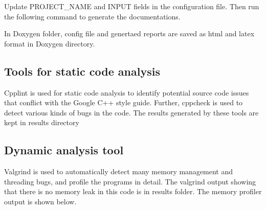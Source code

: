 \begin{DoxyCode}{0}
\end{DoxyCode}
 Update P\+R\+O\+J\+E\+C\+T\+\_\+\+N\+A\+ME and I\+N\+P\+UT fields in the configuration file. Then run the following command to generate the documentations. 
\begin{DoxyCode}{0}
\end{DoxyCode}
 In Doxygen folder, config file and genertaed reports are saved as html and latex format in Doxygen directory.

\subsection*{Tools for static code analysis}

Cpplint is used for static code analysis to identify potential source code issues that conflict with the Google C++ style guide. Further, cppcheck is used to detect various kinds of bugs in the code. The results generated by these tools are kept in results directory

\subsection*{Dynamic analysis tool}

Valgrind is used to automatically detect many memory management and threading bugs, and profile the programs in detail. The valgrind output showing that there is no memory leak in this code is in results folder. The memory profiler output is shown below.

 